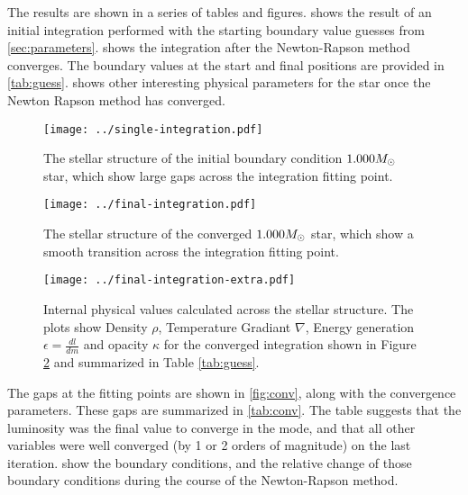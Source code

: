 \documentclass[12pt]{article}
\begin{document}
The results are shown in a series of tables and figures.  shows the result of an initial integration performed with the starting boundary value guesses from \cref{sec:parameters}.  shows the integration after the Newton-Rapson method converges. The boundary values at the start and final positions are provided in \cref{tab:guess}.  shows other interesting physical parameters for the star once the Newton Rapson method has converged.

 \begin{figure}[htbp]
    \centering
    \texttt{[image: ../single-integration.pdf]}
    \caption[Initial Integration]{The stellar structure of the initial boundary condition $1.000 M_\odot$ star, which show large gaps across the integration fitting point.}
    \label{fig:firstint}
 \end{figure}
 
 \begin{figure}[htbp]
    \centering
    \texttt{[image: ../final-integration.pdf]}
    \caption[Converged Integration]{The stellar structure of the converged $1.000 M_\odot$ star, which show a smooth transition across the integration fitting point.}
    \label{fig:finalint}
 \end{figure}
 

 \begin{figure}[htbp]
    \centering
    \texttt{[image: ../final-integration-extra.pdf]}
    \caption[Properties of the Converged Integration]{Internal physical values calculated across the stellar structure. The plots show Density $\rho$, Temperature Gradiant $\nabla$, Energy generation $\epsilon = \frac{dl}{dm}$ and opacity $\kappa$ for the converged integration shown in Figure \ref{fig:finalint} and summarized in Table \ref{tab:guess}. }
    \label{fig:finalintextra}
 \end{figure}
 
\begin{table}[htbp]
\begin{center}
\label{tab:guess}

\end{center}
\end{table}

The gaps at the fitting points are shown in \cref{fig:conv}, along with the convergence parameters. These gaps are summarized in \cref{tab:conv}. The table suggests that the luminosity was the final value to converge in the mode, and that all other variables were well converged (by 1 or 2 orders of magnitude) on the last iteration.  show the boundary conditions, and the relative change of those boundary conditions during the course of the Newton-Rapson method.
\end{document}
